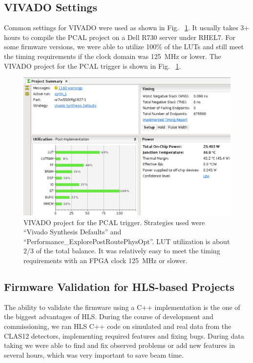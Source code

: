 \subsection{VIVADO Settings}

Common settings for VIVADO were used as shown in Fig. ~\ref{fig:vivado}. It usually takes 3+ hours to compile the PCAL project on a Dell R730 server under RHEL7. For some firmware versions, we were able to utilize 100\% of the LUTs and still meet the timing requirements if the clock domain was 125~MHz or lower. The VIVADO project for the PCAL trigger is shown in Fig. ~\ref{fig:vivado}.

\begin{figure}[hbt]
	\centering
	\includegraphics[width=1.0\columnwidth,keepaspectratio]{img/vivado.png}
	\caption{VIVADO project for the PCAL trigger. Strategies used were ``Vivado Synthesis Defaults'' and ``Performance\_ExplorePostRoutePhysOpt''. LUT utilization is about 2/3 of the total balance. It was relatively easy to meet the timing requirements with an FPGA clock 125~MHz or slower.}
	\label{fig:vivado}
\end{figure}

\subsection{Firmware Validation for HLS-based Projects}

The ability to validate the firmware using a C++ implementation is the one of the biggest advantages of HLS. During the course of development and commissioning, we ran HLS C++ code on simulated and real data from the CLAS12 detectors, implementing required features and fixing bugs. During data taking we were able to find and fix observed problems or add new features in several hours, which was very important to save beam time.

